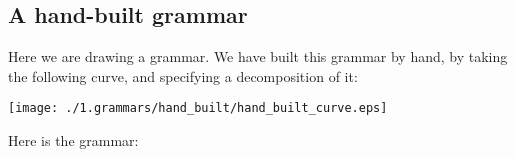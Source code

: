 
\subsection{A hand-built grammar}

Here we are drawing a grammar. We have built this grammar by hand, by
taking the following curve, and specifying a decomposition of it:

\texttt{[image: ./1.grammars/hand\_built/hand\_built\_curve.eps]}

Here is the grammar:

